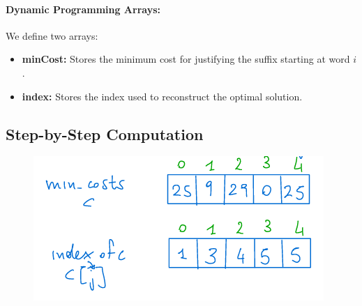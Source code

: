 \paragraph{Dynamic Programming Arrays:}
We define two arrays:
\begin{itemize}
    \item \textbf{minCost:} Stores the minimum cost for justifying the suffix starting at word $i$.
    \item \textbf{index:} Stores the index used to reconstruct the optimal solution.
\end{itemize}

\subsection{Step-by-Step Computation}
\begin{figure}[h!]
    \centering
    \includegraphics[width=1\linewidth]{immagini//capitolo 13/13_9.png}
    \label{fig:enter-label}
\end{figure}


